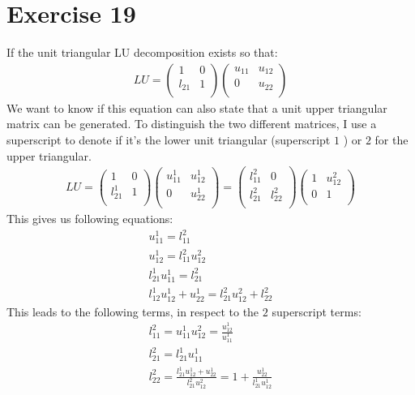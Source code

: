 \section{Exercise 19}
If the unit triangular LU decomposition exists so that:
\begin{gather*}
LU = 
\left( \begin{array}{cc}
1 & 0 \\
l_{21} & 1 \\
\end{array} \right)
\left( \begin{array}{cc}
u_{11} & u_{12} \\
0 & u_{22} \\
\end{array} \right)
\end{gather*}
We want to know if this equation can also state that a unit upper triangular matrix can be generated.
To distinguish the two different matrices, I use a superscript to denote if it's the lower unit triangular (superscript $1$ ) or $2$ for the upper triangular.
\begin{gather*}
LU = 
\left( \begin{array}{cc}
1 & 0 \\
l^1_{21} & 1 \\
\end{array} \right)
\left( \begin{array}{cc}
u^1_{11} & u^1_{12} \\
0 & u^1_{22} \\
\end{array} \right)
=
\left( \begin{array}{cc}
l^2_{11} & 0 \\
l^2_{21} & l^2_{22} \\
\end{array} \right)
\left( \begin{array}{cc}
1 & u ^2_{12} \\
0 & 1 \\
\end{array} \right)
\end{gather*}
This gives us following equations:
\begin{gather*}
u^1_{11} = l^2_{11}  \\
u^1_{12} = l^2_{11} u^2_{12} \\
l^{1}_{21} u^{1}_{11} = l^{2}_{21} \\ 
l^1_{12} u^1_{12} + u^1_{22} = l^2_{21} u^2_{12} + l^2_{22}
\end{gather*}
This leads to the following terms, in respect to the $2$ superscript terms:
\begin{gather*}
l^2_{11} = u^1_{11}
u^2_{12} = \frac{u^1_{12}}{u^1_{11}} \\
l^2_{21} = l^1_{21} u^1_{11} \\
l^2_{22} = \frac{l^1_{21} u^1_{12} + u^1_{22}}{l^2_{21} u^2_{12}} = 1 + \frac{u^1_{22}}{l^1_{21} u^1_{12}} \\
\end{gather*}

